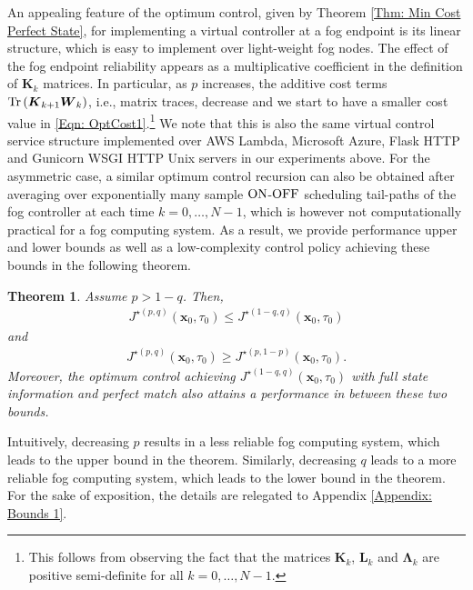 \documentclass[10pt, journal, letterpaper]{IEEEtran}
\newcommand{\paren}[1]{\left(#1\right)}
\newcommand{\1}{\ensuremath{\mathbf{1}}} %
\newcommand{\on}{\ensuremath{{\rm ON}}}
\newcommand{\off}{\ensuremath{{\rm OFF}}}
\newcommand{\mincost}[2]{\ensuremath{J^{\star\paren{#1, #2}}}\paren{\vec{x}_0, \tau_0}}
\renewcommand{\vec}[1]{\ensuremath{\boldsymbol{#1}}} %
\newcommand{\tr}[1]{\ensuremath{{\rm Tr}\left(#1\right)}}
\newtheorem{theorem}{Theorem}
\begin{document}
An appealing feature of the optimum control, given by Theorem \ref{Thm: Min Cost Perfect State}, for implementing a virtual controller at a fog endpoint is its linear structure, which is easy to implement over light-weight fog nodes. The effect of the fog endpoint reliability appears as a multiplicative coefficient in the definition of $\vec{K}_k$ matrices. In particular, as $p$ increases, the additive cost terms $\tr{\vec{K}_{k+1} \vec{W}_k}$, i.e., matrix traces, decrease and we start to have a smaller cost value in \eqref{Eqn: OptCost1}.\footnote{This follows from observing the fact that the matrices $\vec{K}_k$, $\vec{L}_k$ and $\vec{\Lambda}_k$ are positive semi-definite for all $k=0, \ldots, N-1$.} We note that this is also the same virtual control service structure implemented over AWS Lambda, Microsoft Azure, Flask HTTP and Gunicorn WSGI HTTP Unix servers in our experiments above. For the asymmetric case, a similar optimum control recursion can also be obtained after averaging over exponentially many sample $\on$-$\off$ scheduling tail-paths of the fog controller at each time $k = 0, \ldots, N-1$, which is however not computationally practical for a fog computing system. As a result, we provide performance upper and lower bounds as well as a low-complexity control policy achieving these bounds in the following theorem.

\begin{theorem} \label{Thm: Min Cost Bounds1}
Assume $p > 1-q$. Then,
\begin{eqnarray*}
\mincost{p}{q} \leq \mincost{1-q}{q}
\end{eqnarray*}
and
\begin{eqnarray*}
\mincost{p}{q} \geq \mincost{p}{1-p}.
\end{eqnarray*}
Moreover, the optimum control achieving $\mincost{1-q}{q}$ with {\em full} state information and {\em perfect} match also attains a performance in between these two bounds.
\end{theorem}
\begin{IEEEproof}
Intuitively, decreasing $p$ results in a less reliable fog computing system, which leads to the upper bound in the theorem. Similarly, decreasing $q$ leads to a more reliable fog computing system, which leads to the lower bound in the theorem. For the sake of exposition, the details are relegated to Appendix \ref{Appendix: Bounds 1}. \end{IEEEproof}
\end{document}
